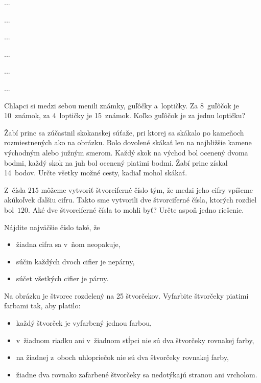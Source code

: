 ﻿{%
...}

{%
...}

{%
...}

{%
...}

{%
...}

{%
...}

{%
Chlapci si medzi sebou menili známky, guľôčky a~loptičky.
Za 8~guľôčok je 10~známok, za 4~loptičky je 15~známok.
Koľko guľôčok je za jednu loptičku?
}

{%
Žabí princ sa zúčastnil skokanskej súťaže, pri ktorej sa skákalo po
kameňoch rozmiestnených ako na obrázku. Bolo dovolené skákať len na
najbližšie kamene východným alebo južným smerom. Každý skok na východ
bol ocenený dvoma bodmi, každý skok na juh bol ocenený piatimi bodmi.
Žabí princ získal 14~bodov.
Určte všetky možné cesty, kadiaľ mohol skákať.
%
}

{%
Z~čísla $215$ môžeme vytvoriť štvorciferné číslo tým, že medzi jeho cifry
vpíšeme akúkoľvek ďalšiu cifru. Takto sme vytvorili dve štvorciferné
čísla, ktorých rozdiel bol~$120$.
Aké dve štvorciferné čísla to mohli byť?
Určte aspoň jedno riešenie.}

{%
Nájdite najväčšie číslo také, že
\begin{itemize}
\item žiadna cifra sa v~ňom neopakuje,
\item súčin každých dvoch cifier je nepárny,
\item súčet všetkých cifier je párny.
\end{itemize}}

{%
Na obrázku je štvorec rozdelený na 25 štvorčekov.
Vyfarbite štvorčeky piatimi farbami tak, aby platilo:
\begin{itemize}
\item každý štvorček je vyfarbený jednou farbou,
\item v~žiadnom riadku ani v~žiadnom stĺpci nie sú dva štvorčeky rovnakej farby,
\item na žiadnej z~oboch uhlopriečok nie sú dva štvorčeky rovnakej farby,
\item žiadne dva rovnako zafarbené štvorčeky sa nedotýkajú stranou ani vrcholom.
\end{itemize}
~%
}


